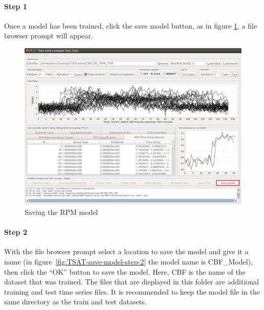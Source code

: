 \documentclass[titlepage, letterpaper, 12pt]{article}
\begin{document}
\paragraph{Step 1}
Once a model has been trained, click the save model button, as in figure \ref{fig:TSAT-save-model-step-1}, a file browser prompt will appear.

\begin{figure}[H]
	\includegraphics[width=\textwidth]{TSAT-save-model-step-1}
	\caption{Saving the RPM model}
	\label{fig:TSAT-save-model-step-1}
\end{figure}

\newpage
\paragraph{Step 2}
With the file browser prompt select a location to save the model and give it a name (in figure~\ref{fig:TSAT-save-model-step-2} the model name is CBF\_Model), then click the ``OK'' button to save the model.  Here, CBF is the name of the dataset that was trained.  The files that are displayed in this folder are additional training and test time series files.  It is recommended to keep the model file in the same directory as the train and test datasets.
\end{document}

